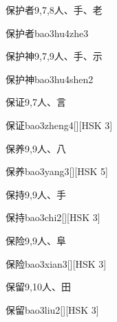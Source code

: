 \begin{entry}{保护者}{9,7,8}{⼈、⼿、⽼}
  \begin{phonetics}{保护者}{bao3hu4zhe3}
  \end{phonetics}
\end{entry}

\begin{entry}{保护神}{9,7,9}{⼈、⼿、⽰}
  \begin{phonetics}{保护神}{bao3hu4shen2}
  \end{phonetics}
\end{entry}

\begin{entry}{保证}{9,7}{⼈、⾔}
  \begin{phonetics}{保证}{bao3zheng4}[][HSK 3]
  \end{phonetics}
\end{entry}

\begin{entry}{保养}{9,9}{⼈、⼋}
  \begin{phonetics}{保养}{bao3yang3}[][HSK 5]
  \end{phonetics}
\end{entry}

\begin{entry}{保持}{9,9}{⼈、⼿}
  \begin{phonetics}{保持}{bao3chi2}[][HSK 3]
  \end{phonetics}
\end{entry}

\begin{entry}{保险}{9,9}{⼈、⾩}
  \begin{phonetics}{保险}{bao3xian3}[][HSK 3]
  \end{phonetics}
\end{entry}

\begin{entry}{保留}{9,10}{⼈、⽥}
  \begin{phonetics}{保留}{bao3liu2}[][HSK 3]
  \end{phonetics}
\end{entry}

